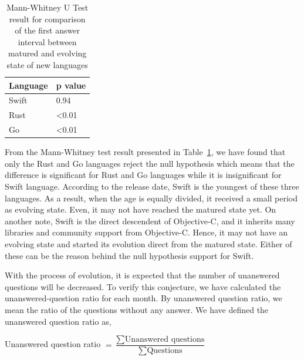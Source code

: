 \begin{table}
\centering
\caption{Mann-Whitney U Test result for comparison of the first answer interval between matured and evolving state of new languages}
\begin{tabular}{|l|l|}
\hline
 Language & p value \\ \hline
 Swift & 0.94  \\ \hline
 Rust & \textless 0.01 \\ \hline
 Go &   \textless 0.01 \\ \hline
\end{tabular}%
\label{table:Mann-Whitney Test answer interval between states}
\end{table}

From the Mann-Whitney test result presented in Table~\ref{table:Mann-Whitney Test answer interval between states}, we have found that only the Rust and Go languages reject the null hypothesis which means that the difference is significant for Rust and Go languages while it is insignificant for Swift language. According to the release date, Swift is the youngest of these three languages. As a result, when the age is equally divided, it received a small period as evolving state. Even, it may not have reached the matured state yet. On another note, Swift is the direct descendent of Objective-C, and it inherits many libraries and community support from Objective-C. Hence, it may not have an evolving state and started its evolution direct from the matured state. Either of these can be the reason behind the null hypothesis support for Swift.

With the process of evolution, it is expected that the number of unanswered questions will be decreased. To verify this conjecture, we have calculated the unanswered-question ratio for each month. By unanswered question ratio, we mean the ratio of the questions without any answer. We have defined the unanswered question ratio as,

Unanswered question ratio $ = \dfrac{\sum \text{Unanswered questions}}{\sum \text{Questions}}$

